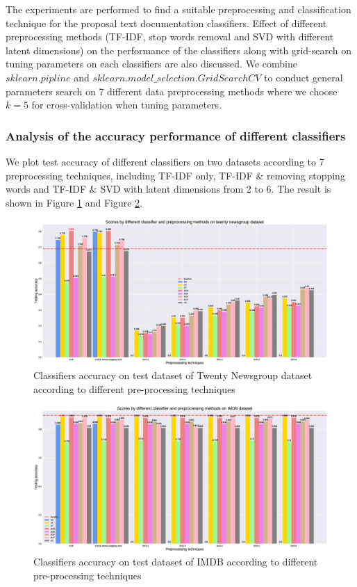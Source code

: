 \documentclass[11pt]{scrartcl}
\begin{document}
The experiments are performed to find a suitable preprocessing and classification technique for the proposal text documentation classifiers. Effect of different preprocessing methods (TF-IDF, stop words removal and SVD with different latent dimensions) on the performance of the classifiers along with grid-search on tuning parameters on each classifiers are also discussed. We combine $sklearn.pipline$ and $sklearn.model\_selection.GridSearchCV$ to conduct general parameters search on 7 different data preprocessing methods where we choose $k=5$ for cross-validation when tuning parameters. 

\subsubsection*{Analysis of the accuracy performance of different classifiers}
We plot test accuracy of different classifiers on two datasets according to 7 preprocessing techniques, including TF-IDF only, TF-IDF \& removing stopping words and TF-IDF \& SVD with latent dimensions from 2 to 6. The result is shown in Figure \ref{accuracy_20} and Figure \ref{accuracy_imdb}.

\begin{figure}[H]
	\centering
	\includegraphics[width=0.9\linewidth]{fig/model_acc_20.eps}
	\caption{Classifiers accuracy on test dataset of Twenty Newsgroup dataset according to different pre-processing techniques}
	\label{accuracy_20}
\end{figure}

\begin{figure}[H]
	\centering
	\includegraphics[width=0.9\linewidth]{fig/model_acc_imdb.eps}
	\caption{Classifiers accuracy on test dataset of IMDB according to different pre-processing techniques}
	\label{accuracy_imdb}
\end{figure}
\end{document}
